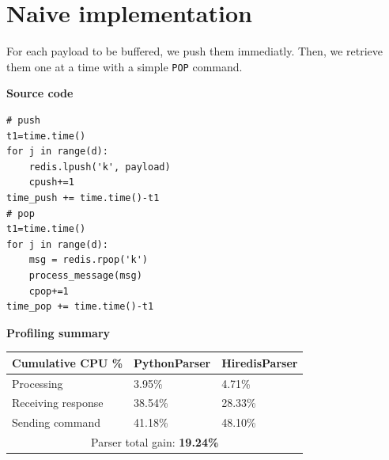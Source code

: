 \documentclass[a4paper, 11pt]{report}
\begin{document}
\newpage
\section{Naive implementation\label{sec:naive}}
For each payload to be buffered, we push them immediatly. Then, we retrieve them one at a time with a simple \texttt{POP} command.\\

\begin{minipage}[t]{0.45\textwidth}
\textbf{Source code}\\
\vspace{-0.5em}
\begin{lstlisting}
# push
t1=time.time()
for j in range(d):
    redis.lpush('k', payload)
    cpush+=1
time_push += time.time()-t1
# pop
t1=time.time()
for j in range(d):
    msg = redis.rpop('k')
    process_message(msg)
    cpop+=1
time_pop += time.time()-t1
\end{lstlisting}
\end{minipage}
\quad
\begin{minipage}[t]{0.5\textwidth}
\textbf{Profiling summary}\\

    \begin{tabular}{|l|l|l|}
        \hline
        Cumulative CPU \% & PythonParser & HiredisParser\\
        \hline
        Processing & 3.95\% & 4.71\%\\
        \hline
        Receiving response & 38.54\% & 28.33\%\\
        \hline
        Sending command & 41.18\% & 48.10\%\\
        \hline
        \multicolumn{3}{|c|}{Parser total gain: \textbf{19.24\%}}\\
        \hline
    \end{tabular}
\end{minipage}
\end{document}
